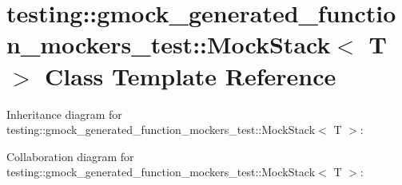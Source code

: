 \hypertarget{classtesting_1_1gmock__generated__function__mockers__test_1_1MockStack}{}\section{testing\+:\+:gmock\+\_\+generated\+\_\+function\+\_\+mockers\+\_\+test\+:\+:Mock\+Stack$<$ T $>$ Class Template Reference}
\label{classtesting_1_1gmock__generated__function__mockers__test_1_1MockStack}


Inheritance diagram for testing\+:\+:gmock\+\_\+generated\+\_\+function\+\_\+mockers\+\_\+test\+:\+:Mock\+Stack$<$ T $>$\+:


Collaboration diagram for testing\+:\+:gmock\+\_\+generated\+\_\+function\+\_\+mockers\+\_\+test\+:\+:Mock\+Stack$<$ T $>$\+:
